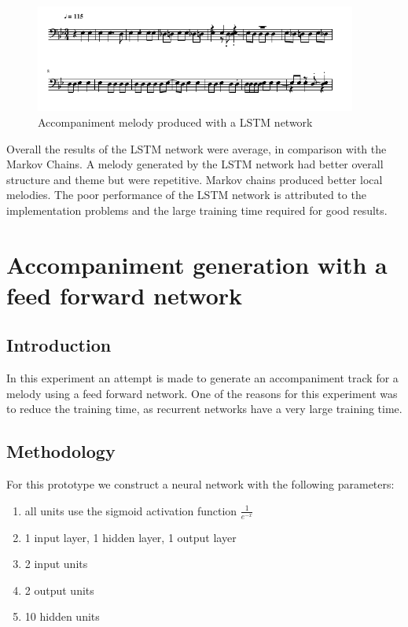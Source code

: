 \begin{figure}
\centerline{\includegraphics[width=400px]{../images/lstm_accomp.pdf}}
\caption{Accompaniment melody produced with a \ac{LSTM} network}
\label{ims:lstmaccomp}
\end{figure}

Overall the results of the \ac{LSTM} network were average, in comparison with the Markov Chains. A melody generated by the \ac{LSTM} network had better overall structure and theme but were repetitive. Markov chains produced better local melodies.
The poor performance of the \ac{LSTM} network is attributed to the implementation problems and the large training time required for good results.


\chapter{Accompaniment generation with a feed forward network}
\section{Introduction}
In this experiment an attempt is made to generate an accompaniment track for a melody using a feed forward network. One of the reasons for this experiment was to reduce the training time, as recurrent networks have a very large training time. 

\section{Methodology}
For this prototype we construct a neural network with the following parameters:
\begin{enumerate}
\item all units use the sigmoid activation function $\frac{1}{e^{-x}}$
\item 1 input layer, 1 hidden layer, 1 output layer
\item 2 input units
\item 2 output units
\item 10 hidden units
\end{enumerate}

